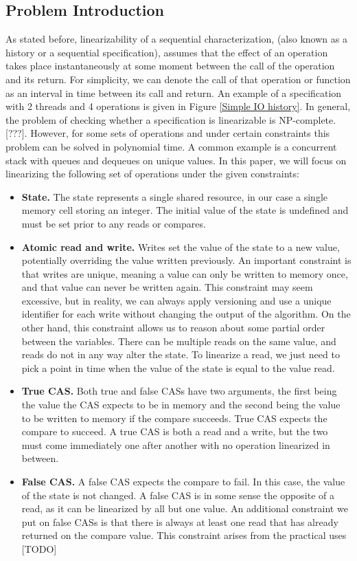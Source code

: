 \documentclass[oneside, a4paper, onecolumn, 10pt]{article}
\begin{document}
\subsection{Problem Introduction}
As stated before, linearizability of a sequential characterization, (also known as a history or a sequential specification), assumes that the effect of an operation takes place instantaneously at some moment between the call of the operation and its return. For simplicity, we can denote the call of that operation or function as an interval in time between its call and return. An example of a specification with 2 threads and 4 operations is given in Figure \ref{Simple IO history}.
In general, the problem of checking whether a specification is linearizable is NP-complete. [???]. However, for some sets of operations and under certain constraints this problem can be solved in polynomial time. A common example is a concurrent stack with queues and dequeues on unique values. In this paper, we will focus on linearizing the following set of operations under the given constraints:
\begin{itemize}
  \item \textbf{State.} The state represents a single shared resource, in our case a single memory cell storing an integer. The initial value of the state is undefined and must be set prior to any reads or compares.
  \item \textbf{Atomic read and write.} Writes set the value of the state to a new value, potentially overriding the value written previously. An important constraint is that writes are unique, meaning a value can only be written to memory once, and that value can never be written again. This constraint may seem excessive, but in reality, we can always apply versioning and use a unique identifier for each write without changing the output of the algorithm. On the other hand, this constraint allows us to reason about some partial order between the variables. There can be multiple reads on the same value, and reads do not in any way alter the state. To linearize a read, we just need to pick a point in time when the value of the state is equal to the value read.
  \item \textbf{True CAS.} Both true and false CASs have two arguments, the first being the value the CAS expects to be in memory and the second being the value to be written to memory if the compare succeeds. True CAS expects the compare to succeed. A true CAS is both a read and a write, but the two must come immediately one after another with no operation linearized in between.
  \item \textbf{False CAS.} A false CAS expects the compare to fail. In this case, the value of the state is not changed. A false CAS is in some sense the opposite of a read, as it can be linearized by all but one value. An additional constraint we put on false CASs is that there is always at least one read that has already returned on the compare value. This constraint arises from the practical uses [TODO]
\end{itemize}
\end{document}
